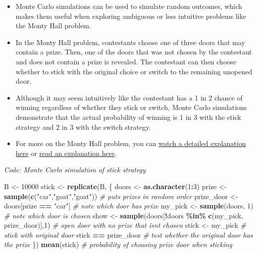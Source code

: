 \documentclass[
]{article}
\newenvironment{Shaded}{\begin{snugshade}}{\end{snugshade}}
\newcommand{\CommentTok}[1]{\textcolor[rgb]{0.56,0.35,0.01}{\textit{#1}}}
\newcommand{\DecValTok}[1]{\textcolor[rgb]{0.00,0.00,0.81}{#1}}
\newcommand{\KeywordTok}[1]{\textcolor[rgb]{0.13,0.29,0.53}{\textbf{#1}}}
\newcommand{\NormalTok}[1]{#1}
\newcommand{\OperatorTok}[1]{\textcolor[rgb]{0.81,0.36,0.00}{\textbf{#1}}}
\newcommand{\StringTok}[1]{\textcolor[rgb]{0.31,0.60,0.02}{#1}}
\providecommand{\tightlist}{%
  \setlength{\itemsep}{0pt}\setlength{\parskip}{0pt}}
\begin{document}
\begin{itemize}
\tightlist
\item
  Monte Carlo simulations can be used to simulate random outcomes, which
  makes them useful when exploring ambiguous or less intuitive problems
  like the Monty Hall problem.
\item
  In the Monty Hall problem, contestants choose one of three doors that
  may contain a prize. Then, one of the doors that was not chosen by the
  contestant and does not contain a prize is revealed. The contestant
  can then choose whether to stick with the original choice or switch to
  the remaining unopened door.
\item
  Although it may seem intuitively like the contestant has a 1 in 2
  chance of winning regardless of whether they stick or switch, Monte
  Carlo simulations demonstrate that the actual probability of winning
  is 1 in 3 with the stick strategy and 2 in 3 with the switch strategy.
\item
  For more on the Monty Hall problem, you can
  \href{https://www.khanacademy.org/math/precalculus/prob-comb/dependent-events-precalc/v/monty-hall-problem}{watch
  a detailed explanation here} or
  \href{https://en.wikipedia.org/wiki/Monty_Hall_problem}{read an
  explanation here}.
\end{itemize}

\emph{Code: Monte Carlo simulation of stick strategy}

\begin{Shaded}
\begin{Highlighting}[]
\NormalTok{B \textless{}{-}}\StringTok{ }\DecValTok{10000}
\NormalTok{stick \textless{}{-}}\StringTok{ }\KeywordTok{replicate}\NormalTok{(B, \{}
\NormalTok{  doors \textless{}{-}}\StringTok{ }\KeywordTok{as.character}\NormalTok{(}\DecValTok{1}\OperatorTok{:}\DecValTok{3}\NormalTok{)}
\NormalTok{  prize \textless{}{-}}\StringTok{ }\KeywordTok{sample}\NormalTok{(}\KeywordTok{c}\NormalTok{(}\StringTok{"car"}\NormalTok{,}\StringTok{"goat"}\NormalTok{,}\StringTok{"goat"}\NormalTok{))    }\CommentTok{\# puts prizes in random order}
\NormalTok{  prize\_door \textless{}{-}}\StringTok{ }\NormalTok{doors[prize }\OperatorTok{==}\StringTok{ "car"}\NormalTok{]    }\CommentTok{\# note which door has prize}
\NormalTok{  my\_pick  \textless{}{-}}\StringTok{ }\KeywordTok{sample}\NormalTok{(doors, }\DecValTok{1}\NormalTok{)    }\CommentTok{\# note which door is chosen}
\NormalTok{  show \textless{}{-}}\StringTok{ }\KeywordTok{sample}\NormalTok{(doors[}\OperatorTok{!}\NormalTok{doors }\OperatorTok{\%in\%}\StringTok{ }\KeywordTok{c}\NormalTok{(my\_pick, prize\_door)],}\DecValTok{1}\NormalTok{)    }\CommentTok{\# open door with no prize that isn\textquotesingle{}t chosen}
\NormalTok{  stick \textless{}{-}}\StringTok{ }\NormalTok{my\_pick    }\CommentTok{\# stick with original door}
\NormalTok{  stick }\OperatorTok{==}\StringTok{ }\NormalTok{prize\_door    }\CommentTok{\# test whether the original door has the prize}
\NormalTok{\})}
\KeywordTok{mean}\NormalTok{(stick)    }\CommentTok{\# probability of choosing prize door when sticking}
\end{Highlighting}
\end{Shaded}
\end{document}
